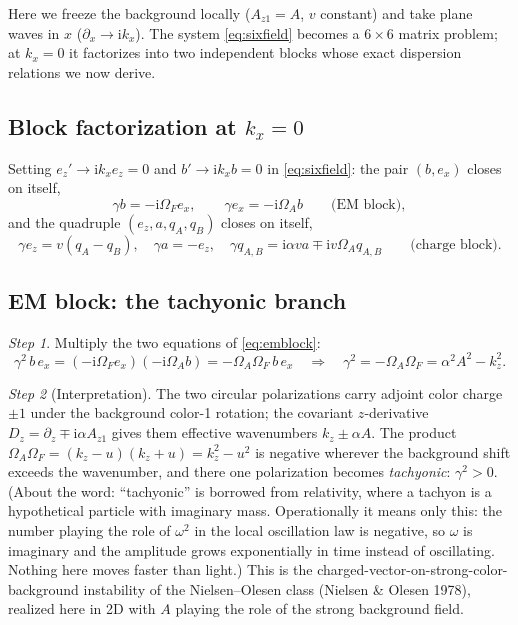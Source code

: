 \documentclass[11pt,a4paper]{article}
\numberwithin{equation}{section}
\theoremstyle{remark}
\newtheorem{step}{Step}[subsection]
\newcommand{\kz}{k_z}
\newcommand{\OmA}{\Omega_A}
\newcommand{\OmF}{\Omega_F}
\newcommand{\Az}{A_{z1}}
\newcommand{\ii}{\mathrm{i}}
\begin{document}
Here we freeze the background locally ($\Az=A$, $v$ constant) and take
plane waves in $x$ ($\partial_x\to\ii k_x$). The system \eqref{eq:sixfield}
becomes a $6\times6$ matrix problem; at $k_x=0$ it factorizes into two
independent blocks whose exact dispersion relations we now derive.

\subsection{Block factorization at $k_x=0$}

Setting $e_z'\to\ii k_xe_z=0$ and $b'\to\ii k_xb=0$ in
\eqref{eq:sixfield}: the pair $(b,e_x)$ closes on itself,
\begin{equation}
\gamma b=-\ii\OmF e_x,\qquad \gamma e_x=-\ii\OmA b
\qquad\text{(EM block)},
\label{eq:emblock}
\end{equation}
and the quadruple $(e_z,a,q_A,q_B)$ closes on itself,
\begin{equation}
\gamma e_z=v(q_A-q_B),\quad
\gamma a=-e_z,\quad
\gamma q_{A,B}=\ii\alpha v a\mp\ii v\OmA q_{A,B}
\qquad\text{(charge block)}.
\label{eq:chargeblock}
\end{equation}

\subsection{EM block: the tachyonic branch}
\label{ssec:tachyon}

\begin{step}
Multiply the two equations of \eqref{eq:emblock}:
\begin{equation}
\gamma^2\,b\,e_x=(-\ii\OmF e_x)(-\ii\OmA b)=-\OmA\OmF\,b\,e_x
\quad\Longrightarrow\quad
\gamma^2=-\OmA\OmF=\alpha^2A^2-\kz^2 .
\label{eq:tachyon}
\end{equation}
\end{step}

\begin{step}[Interpretation]
The two circular polarizations carry adjoint color charge $\pm1$ under the
background color-1 rotation; the covariant $z$-derivative
$D_z=\partial_z\mp\ii\alpha\Az$ gives them effective wavenumbers
$\kz\pm\alpha A$. The product $\OmA\OmF=(\kz-u)(\kz+u)=\kz^2-u^2$ is
negative wherever the background shift exceeds the wavenumber, and there
one polarization becomes \emph{tachyonic}: $\gamma^2>0$. (About the
word: ``tachyonic'' is borrowed from relativity, where a tachyon is a
hypothetical particle with imaginary mass. Operationally it means only
this: the number playing the role of $\omega^2$ in the local
oscillation law is negative, so $\omega$ is imaginary and the amplitude
grows exponentially in time instead of oscillating. Nothing here moves
faster than light.) This is the
charged-vector-on-strong-color-background instability of the
Nielsen--Olesen class (Nielsen \& Olesen 1978), realized here in 2D with
$A$ playing the role of the strong background field.
\end{step}
\end{document}
